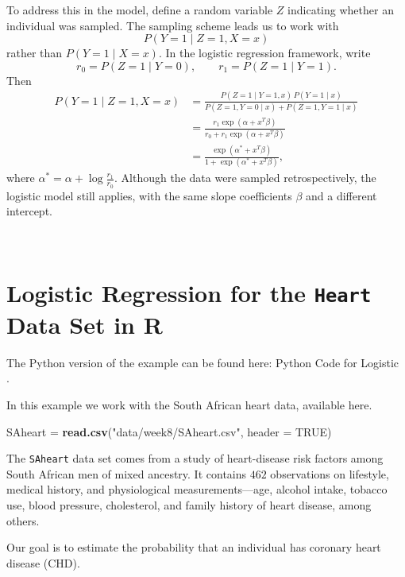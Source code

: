 \documentclass[
]{book}
\newenvironment{Shaded}{\begin{snugshade}}{\end{snugshade}}
\newcommand{\AttributeTok}[1]{\textcolor[rgb]{0.13,0.29,0.53}{#1}}
\newcommand{\ConstantTok}[1]{\textcolor[rgb]{0.56,0.35,0.01}{#1}}
\newcommand{\FunctionTok}[1]{\textcolor[rgb]{0.13,0.29,0.53}{\textbf{#1}}}
\newcommand{\NormalTok}[1]{#1}
\newcommand{\OtherTok}[1]{\textcolor[rgb]{0.56,0.35,0.01}{#1}}
\newcommand{\StringTok}[1]{\textcolor[rgb]{0.31,0.60,0.02}{#1}}
\begin{document}
To address this in the model, define a random variable \(Z\) indicating whether an individual was sampled. The sampling scheme leads us to work with
\[P(Y=1 \mid Z=1, X=x)\]
rather than \(P(Y=1 \mid X=x)\). In the logistic regression framework, write
\[r_0 = P(Z=1 \mid Y=0), \qquad r_1 = P(Z=1 \mid Y=1).\]
Then
\begin{align*}
P(Y=1 \mid Z=1, X=x) &= \frac{P(Z=1 \mid Y=1,x)\, P(Y=1 \mid x)}{P(Z=1, Y=0 \mid x) + P(Z=1, Y=1 \mid x)}\\
&= \frac{r_1 \exp(\alpha + x^T \beta)}{r_0 + r_1 \exp(\alpha + x^T \beta)}\\
&= \frac{\exp(\alpha^* + x^T \beta)}{ 1 + \exp(\alpha^* + x^T \beta)},
\end{align*}
where \(\alpha^* = \alpha + \log\frac{r_1}{r_0}\). Although the data were sampled retrospectively, the logistic model still applies, with the same slope coefficients \(\beta\) and a different intercept.

~

\section{\texorpdfstring{Logistic Regression for the \texttt{Heart} Data Set in R}{Logistic Regression for the Heart Data Set in R}}\label{logistic-regression-for-the-heart-data-set-in-r}

The Python version of the example can be found here: Python Code for Logistic .~

In this example we work with the South African heart data, available here.

\begin{Shaded}
\begin{Highlighting}[]
\NormalTok{SAheart }\OtherTok{=} \FunctionTok{read.csv}\NormalTok{(}\StringTok{"data/week8/SAheart.csv"}\NormalTok{, }\AttributeTok{header =} \ConstantTok{TRUE}\NormalTok{)}
\end{Highlighting}
\end{Shaded}

The \texttt{SAheart} data set comes from a study of heart-disease risk factors among South African men of mixed ancestry. It contains \(462\) observations on lifestyle, medical history, and physiological measurements---age, alcohol intake, tobacco use, blood pressure, cholesterol, and family history of heart disease, among others.

Our goal is to estimate the probability that an individual has coronary heart disease (CHD).
\end{document}
